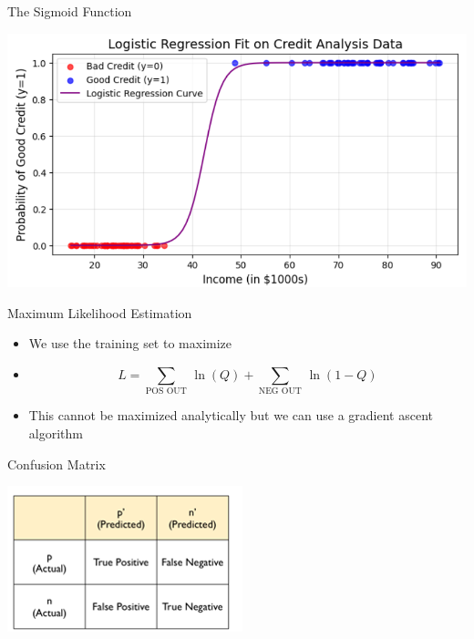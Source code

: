 \documentclass[11pt]{beamer}
\begin{document}
\begin{frame}{The Sigmoid Function}
	\begin{center}
	\includegraphics[scale=.45]{../05-pictures/lesson-3-1_pic_9.png}
	\end{center}
\end{frame}
\begin{frame}{Maximum Likelihood Estimation}
	\begin{itemize}
		\item We use the training set to maximize
		\item \begin{equation}L=\sum\limits_\text{POS OUT} \, \ln(Q) + \sum\limits_\text{NEG OUT} \, \ln(1-Q) \end{equation}
		\item This cannot be maximized analytically but we can use a gradient ascent algorithm
	\end{itemize}
\end{frame}
\begin{frame}{Confusion Matrix}
	\begin{center}
	\includegraphics[scale=1]{../05-pictures/lesson-3-1_pic_10.png}
	\end{center}
\end{frame}
\end{document}
